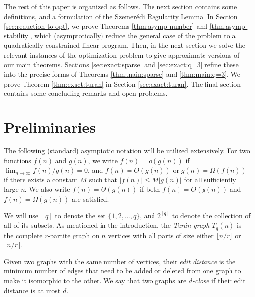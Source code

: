 \documentclass[11pt]{article}
\begin{document}
\vspace{3mm}






The rest of this paper is organized as follows.  The next section
contains some definitions, and a formulation of the Szemer\'edi
Regularity Lemma.  In Section \ref{sec:reduction-to-opt}, we prove
Theorems \ref{thm:asymp-number} and \ref{thm:asymp-stability}, which
(asymptotically) reduce the general case of the problem to a
quadratically constrained linear program.  Then, in the next section
we solve the relevant instances of the optimization problem to give
approximate versions of our main theorems.  Sections
\ref{sec:exact:sparse} and \ref{sec:exact:q=3} refine these into the
precise forms of Theorems \ref{thm:main:sparse} and
\ref{thm:main:q=3}.  We prove Theorem \ref{thm:exact:turan} in Section
\ref{sec:exact:turan}.  The final section contains some concluding
remarks and open problems.




\section{Preliminaries}
\label{sec:preliminaries}

The following (standard) asymptotic notation will be utilized
extensively.  For two functions $f(n)$ and $g(n)$, we write $f(n) =
o(g(n))$ if $\lim_{n \rightarrow \infty} f(n)/g(n) = 0$, and $f(n) =
O(g(n))$ or $g(n) = \Omega(f(n))$ if there exists a constant $M$ such
that $|f(n)| \leq M|g(n)|$ for all sufficiently large $n$.  We also
write $f(n) = \Theta(g(n))$ if both $f(n) = O(g(n))$ and $f(n) =
\Omega(g(n))$ are satisfied.

We will use $[q]$ to denote the set $\{1, 2, \ldots, q\}$, and
$2^{[q]}$ to denote the collection of all of its subsets.  As
mentioned in the introduction, the \emph{Tur\'an graph} $T_q(n)$ is
the complete $r$-partite graph on $n$ vertices with all parts of size
either $\lfloor n/r \rfloor$ or $\lceil n/r \rceil$.

Given two graphs with the same number of vertices, their \emph{edit
  distance}\/ is the minimum number of edges that need to be added or
deleted from one graph to make it isomorphic to the other.  We say
that two graphs are \emph{$d$-close}\/ if their edit distance is at
most $d$.



\end{document}
